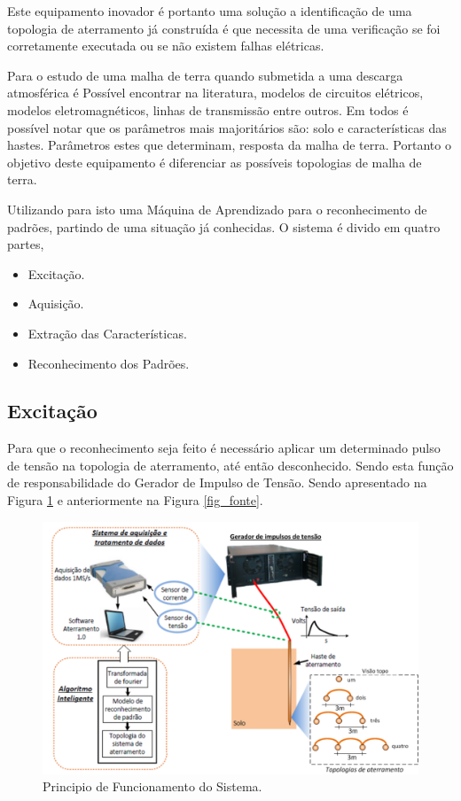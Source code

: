 \documentclass[a4paper, 10pt]{article}
\begin{document}
Este equipamento inovador é portanto uma solução a identificação de uma topologia
de aterramento já construída é que necessita de uma verificação se foi corretamente
executada ou se não existem falhas elétricas.

Para o estudo de uma malha de terra quando submetida a uma descarga atmosférica 
é Possível encontrar na literatura, modelos de circuitos elétricos, modelos 
eletromagnéticos, linhas de transmissão entre outros. Em todos é possível notar 
que os parâmetros mais majoritários são: solo e características das hastes. 
Parâmetros estes que determinam, resposta da malha de terra. Portanto o objetivo
deste equipamento é diferenciar as possíveis topologias de malha de terra. 

Utilizando para isto uma Máquina de Aprendizado para o reconhecimento de padrões, 
partindo de uma situação já conhecidas. O sistema é divido em quatro partes, 

\begin{itemize}
    \item Excitação.
    \item Aquisição.
    \item Extração das Características.
    \item Reconhecimento dos Padrões.
\end{itemize}

\subsection{Excitação}

Para que o reconhecimento seja feito é necessário aplicar um determinado pulso
de tensão na topologia de aterramento, até então desconhecido. 
Sendo esta função de responsabilidade do Gerador de Impulso de Tensão. 
Sendo apresentado na Figura \ref{fig_principio_funcionamento} e 
anteriormente na Figura \ref{fig_fonte}.

\begin{figure}[!h]
        \caption{\label{fig_principio_funcionamento}Principio de Funcionamento do Sistema.}
	    \begin{center}
            \includegraphics[scale=0.3]{../fotos/principio/principio_de_funcionamento_corte.pdf}
	    \end{center}
\end{figure}
\end{document}
